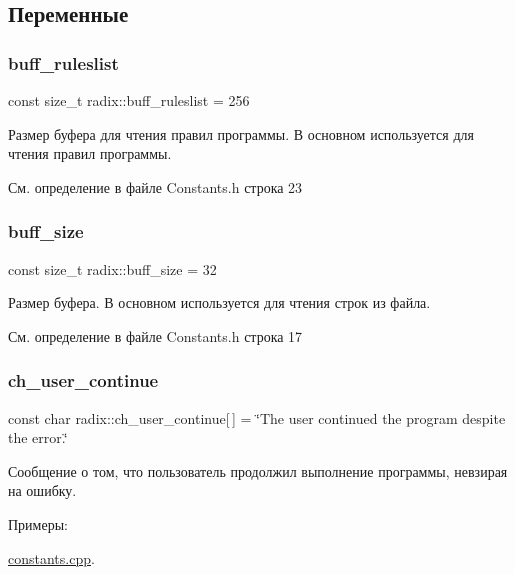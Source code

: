 \subsection{Переменные}
\mbox{\label{namespaceradix_a8f000aabf647d34fd877c33958bad711}} 
\subsubsection{\texorpdfstring{buff\+\_\+ruleslist}{buff\_ruleslist}}
{\footnotesize\ttfamily const size\+\_\+t radix\+::buff\+\_\+ruleslist = 256}

Размер буфера для чтения правил программы. В основном используется для чтения правил программы. 

См. определение в файле Constants.\+h строка 23

\mbox{\label{namespaceradix_a82e81e89088b6430b7ec11a8a0329e9c}} 
\subsubsection{\texorpdfstring{buff\+\_\+size}{buff\_size}}
{\footnotesize\ttfamily const size\+\_\+t radix\+::buff\+\_\+size = 32}

Размер буфера. В основном используется для чтения строк из файла. 

См. определение в файле Constants.\+h строка 17

\mbox{\label{namespaceradix_ad5e76eca849713be360ed8478545d801}} 
\subsubsection{\texorpdfstring{ch\+\_\+user\+\_\+continue}{ch\_user\_continue}}
{\footnotesize\ttfamily const char radix\+::ch\+\_\+user\+\_\+continue\mbox{[}$\,$\mbox{]} = \char`\"{}The user continued the program despite the error.\char`\"{}}

Сообщение о том, что пользователь продолжил выполнение программы, невзирая на ошибку. \begin{Desc}
\item[Примеры\+: ]\par
\hyperlink{constants_8cpp-example}{constants.\+cpp}.\end{Desc}


